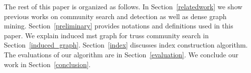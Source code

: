 The rest of this paper is organized as follows. In Section~\ref{relatedwork} we show previous works on community search and detection as well as dense graph mining. Section~\ref{preliminary} provides notations and definitions used in this paper. We explain induced mst graph for truss community search in Section~\ref{induced_graph}. Section~\ref{index} discusses index construction algorithm. The evaluations of our algorithm are in Section~\ref{evaluation}. We conclude our work in Section~\ref{conclusion}.


~\cite{durmaz2017frequent}


